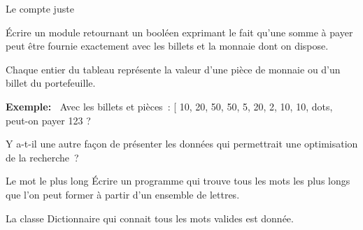 	\begin{Exercice}{Le compte juste}
		
		Écrire un module retournant un booléen exprimant 
		le fait qu'une somme à payer peut être fournie 
		exactement avec les billets et la monnaie dont on dispose.
		
		
		Chaque entier du tableau représente la valeur d'une 
		pièce de monnaie ou d'un billet du portefeuille.

		\textbf{Exemple:~} 
		Avec les billets et pièces~: [ 10, 20, 50, 50, 5, 20, 2, 10, 10, {dots}, 
		peut-on payer 123 {\texteuro} ?
		
		Y a-t-il une autre façon de présenter les données 
		qui permettrait une optimisation de la recherche~?
	\end{Exercice}
	
	\begin{Exercice}{Le mot le plus long}
		Écrire un programme qui trouve tous les mots les plus 
		longs que l'on peut former à partir d'un ensemble de lettres.
		

		La classe Dictionnaire qui connait tous les mots valides est donnée.
		
		
	\end{Exercice}
		